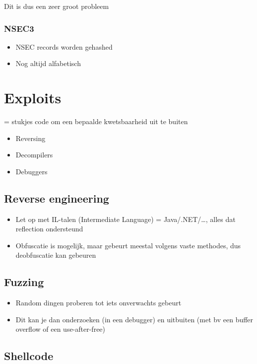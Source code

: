 \documentclass{article}
\begin{document}
Dit is dus een zeer groot probleem

\subsubsection{NSEC3}

\begin{itemize}
    \item NSEC records worden gehashed
    \item Nog altijd alfabetisch
\end{itemize}

\section{Exploits}

= stukjes code om een bepaalde kwetsbaarheid uit te buiten

\begin{itemize}
    \item Reversing 
    \item Decompilers
    \item Debuggers
\end{itemize}

\subsection{Reverse engineering}

\begin{itemize}
    \item Let op met IL-talen (Intermediate Language) = Java/.NET/\dots, alles dat reflection ondersteund
    \item Obfuscatie is mogelijk, maar gebeurt meestal volgens vaste methodes, dus deobfuscatie kan gebeuren 
\end{itemize}

\subsection{Fuzzing}

\begin{itemize}
    \item Random dingen proberen tot iets onverwachts gebeurt
    \item Dit kan je dan onderzoeken (in een debugger) en uitbuiten (met bv een buffer overflow of een use-after-free)
\end{itemize}

\subsection{Shellcode}
\end{document}
